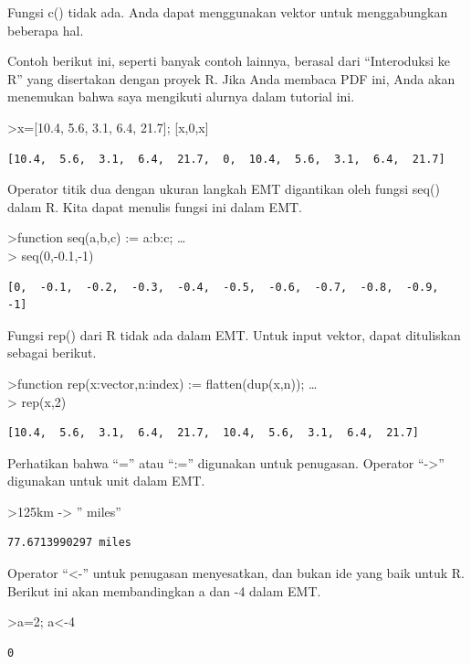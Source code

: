 \documentclass[
]{book}
\begin{document}
Fungsi c() tidak ada. Anda dapat menggunakan vektor untuk menggabungkan beberapa hal.

Contoh berikut ini, seperti banyak contoh lainnya, berasal dari ``Interoduksi ke R'' yang disertakan dengan proyek R. Jika Anda membaca PDF ini, Anda akan menemukan bahwa saya mengikuti alurnya dalam tutorial ini.

\textgreater x={[}10.4, 5.6, 3.1, 6.4, 21.7{]}; {[}x,0,x{]}

\begin{verbatim}
[10.4,  5.6,  3.1,  6.4,  21.7,  0,  10.4,  5.6,  3.1,  6.4,  21.7]
\end{verbatim}

Operator titik dua dengan ukuran langkah EMT digantikan oleh fungsi seq() dalam R. Kita dapat menulis fungsi ini dalam EMT.

\textgreater function seq(a,b,c) := a:b:c; \ldots{}\\
\textgreater{} seq(0,-0.1,-1)

\begin{verbatim}
[0,  -0.1,  -0.2,  -0.3,  -0.4,  -0.5,  -0.6,  -0.7,  -0.8,  -0.9,  -1]
\end{verbatim}

Fungsi rep() dari R tidak ada dalam EMT. Untuk input vektor, dapat dituliskan sebagai berikut.

\textgreater function rep(x:vector,n:index) := flatten(dup(x,n)); \ldots{}\\
\textgreater{} rep(x,2)

\begin{verbatim}
[10.4,  5.6,  3.1,  6.4,  21.7,  10.4,  5.6,  3.1,  6.4,  21.7]
\end{verbatim}

Perhatikan bahwa ``='' atau ``:='' digunakan untuk penugasan. Operator ``-\textgreater{}'' digunakan untuk unit dalam EMT.

\textgreater125km -\textgreater{} '' miles''

\begin{verbatim}
77.6713990297 miles
\end{verbatim}

Operator ``\textless-'' untuk penugasan menyesatkan, dan bukan ide yang baik untuk R. Berikut ini akan membandingkan a dan -4 dalam EMT.

\textgreater a=2; a\textless-4

\begin{verbatim}
0
\end{verbatim}
\end{document}
